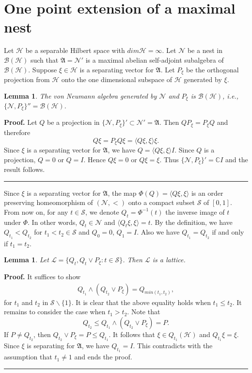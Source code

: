 \documentclass[12pt]{article}
\newtheorem{lemma}[theorem]{Lemma}
\newenvironment{proof}[1][Proof]{\textbf{#1.} }{\ \rule{0.5em}{0.5em}}
\newcommand{\AAA}{\mathfrak A}
\newcommand{\BBB}{\mathcal B}
\newcommand{\HHH}{\mathscr H} %
\newcommand{\LLL}{\mathscr L} %
\newcommand{\NNN}{\mathcal N} %
\newcommand{\SSS}{\mathcal S}
\newcommand{\PP}[1]{ P_{#1}} %
\newcommand{\QQ}[1]{ Q_{#1}}
\begin{document}
\section{One point extension of a maximal nest}

Let $\HHH$ be a separable Hilbert space with $dim\HHH = \infty$.
Let $\NNN$ be a nest in $\BBB(\HHH)$ such that $\AAA =\NNN '$ is a
maximal abelian self-adjoint subalgebra of $\BBB(\HHH)$. Suppose
$\xi \in \HHH$ is a separating vector for $\AAA$. Let $P_{\xi}$ be
the orthogonal projection from $\HHH$ onto the one dimensional
subspace of $\HHH$ generated by $\xi$.

\begin{lemma} The von Neumann algebra generated by $\NNN$ and
$P_{\xi}$ is $\BBB(\HHH)$, i.e.,  $\{ \NNN, \PP\xi \}'' =
\BBB(\HHH)$.
\end{lemma}

\noindent\begin{proof} Let $Q$ be a projection in $\{\NNN, \PP\xi
\}' \subset \NNN' = \AAA$. Then $Q\PP\xi = \PP\xi Q$ and therefore
$$ Q \xi = \PP\xi Q\xi=\langle  Q\xi, \xi \rangle \xi.
$$
Since $\xi$ is a separating vector for $\AAA$, we have $Q = \langle
Q\xi, \xi\rangle I$. Since $Q$ is a projection, $Q=0$ or $Q=I$.
Hence $Q\xi=0$ or $Q\xi=\xi$. Thus $\{\NNN, \PP\xi \}'=\mathbb{C}I$
and the result follows.
\end{proof}\newline

Since $\xi$ is a separating vector for $\AAA$, the map $\Phi(Q) =
\langle Q\xi, \xi\rangle$ is  an order preserving homeomorphism of
$(\NNN, <)$ onto a compact subset $\SSS$ of $[0, 1]$. From now on,
for any $t \in \SSS$, we denote $\QQ t = \Phi^{-1}(t)$ the inverse
image of $t$ under $\Phi$. In other words, $\QQ t \in \NNN$ and
$\langle \QQ t \xi , \xi \rangle = t$. By the definition, we have
$\QQ {t_1}< \QQ {t_2}$ for $t_1 < t_2 \in \SSS$ and $\QQ 0 = 0$,
$\QQ 1 = I$. Also we have $\QQ {t_1} = \QQ {t_2} $ if and only if
$t_1 = t_2$.


\begin{lemma} Let $\LLL = \{ \QQ {t} , \QQ {t} \vee \PP {\xi} : t\in \SSS\}$.
Then $\LLL $ is a lattice.
\end{lemma}

\noindent\begin{proof} It suffices to show
\begin{align*}
\QQ {t_1} \wedge  (\QQ {t_2} \vee \PP {\xi}) = \QQ {min(t_1, t_2)},
\end{align*}
for $t_1$ and $t_2$ in $\SSS\backslash  \{1\}$. It is clear that the
above equality holds when $t_1 \leq t_2$. It remains to consider the
case when $t_1
> t_2$. Note that $$\QQ {t_2} \leq \QQ {t_1} \wedge  (\QQ {t_2} \vee \PP
{\xi}) = P.$$ If $P \neq \QQ {t_2}$, then $\QQ {t_2} \vee \PP {\xi}
= P \leq \QQ {t_1}$. It follows that $\xi \in \QQ {t_1}(\HHH)$ and
$\QQ{t_1}\xi=\xi$. Since $\xi$ is separating for $\AAA$, we have
$\QQ {t_1}=I$. This contradicts with the assumption that $t_1\neq 1$
and ends the proof.
\end{proof}\newline
\end{document}
